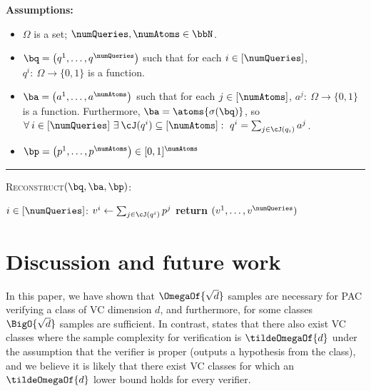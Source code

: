 \documentclass[11pt]{article}
\begin{document}
\begin{protocol}[H]
	\begin{ShadedAlgorithmBox}
		{\bfseries Assumptions:}
		\begin{itemize}
			\item{$\Omega$ is a set; $\numQueries,\numAtoms \in \bbN$.}
			\item{
				$\bq = \left(q^1,\dots,q^{\numQueries}\right)$ such that for each $i \in [\numQueries]$, $q^i:\: \Omega \to \{0,1\}$ is a function.
			}
			\item{
				$\ba = \left(a^1,\dots,a^{\numAtoms}\right)$ such that for each $j \in [\numAtoms]$, $a^j:\: \Omega \to \{0,1\}$ is a function. Furthermore,
				$\ba = \atoms{\sigma(\bq)}$, so $\forall \: i \in [\numQueries]~ \exists \: \cJ(q^i) \subseteq [\numAtoms]: ~ q^i = \sum_{j \in \cJ(q_i)} a^j$.
			}
			\item{
				$\bp = \left(p^1,\dots,p^{\numAtoms}\right) \in [0,1]^{\numAtoms}$
			}
		\end{itemize}
		
		\noindent\rule{\textwidth}{0.5pt}
		
		\vspace*{0.5em}
		
		\textsc{Reconstruct}$(\bq,\ba,\bp)$:
		\begin{algorithmic}
			\For $i \in [\numQueries]$:
				\State $v^i \gets \sum_{j \in \cJ(q^i)} p^j$
			\EndFor
			\State \textbf{return} $(v^1,\dots,v^{\numQueries})$
		\end{algorithmic}
		
	\end{ShadedAlgorithmBox}
	\caption{A subroutine of \cref{protocol:sq-verifier-iteration}. Compute the evaluations for a collection of statistical queries $\bq$ with atoms $\ba$ given evaluations $\bp$ for the atoms.}
	\label{protocol:sq-reconstruct-valuations}
\end{protocol}


\section{Discussion and future work}

In this paper, we have shown that $\OmegaOf{\sqrt{d}}$ samples are necessary for PAC verifying a class of VC dimension $d$, and furthermore, for some classes $\BigO{\sqrt{d}}$ samples are sufficient. In contrast, %
\cite[Lemma 4.1]{GoldwasserRSY21}  %
states that there also exist VC classes where the sample complexity for verification
is $\tildeOmegaOf{d}$ under the assumption that the verifier is proper (outputs a hypothesis from the class), and we believe it is likely that there exist VC classes for which an $\tildeOmegaOf{d}$ lower bound holds for every verifier. 
\end{document}
